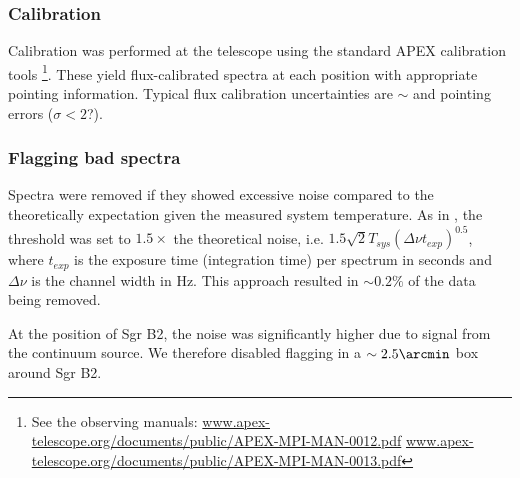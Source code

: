 \subsubsection{Calibration}
Calibration was performed at the telescope using the standard APEX calibration
tools
\footnote{See the observing manuals:
\url{www.apex-telescope.org/documents/public/APEX-MPI-MAN-0012.pdf}
\url{www.apex-telescope.org/documents/public/APEX-MPI-MAN-0013.pdf} }.
These yield flux-calibrated spectra at each position with appropriate pointing
information.  Typical flux calibration uncertainties are $\sim$  and
pointing errors  ($\sigma<2$\arcsec ?).

\subsubsection{Flagging bad spectra}
Spectra were removed if they showed excessive noise compared to the
theoretically expectation given the measured system temperature.  As in
\citet{Ao2013a}, the threshold was set to $1.5\times$ the theoretical noise,
i.e. $1.5 \sqrt{2} T_{sys} (\Delta\nu t_{exp})^0.5$, where $t_{exp}$ is the
exposure time (integration time) per spectrum in seconds and $\Delta\nu$ is the
channel width in Hz.  This approach resulted in $\sim0.2\%$ of the data being
removed.  

At the position of Sgr B2, the noise was significantly higher due to signal
from the continuum source.  We therefore disabled flagging in a
$\sim2.5\arcmin$ box around Sgr B2.




